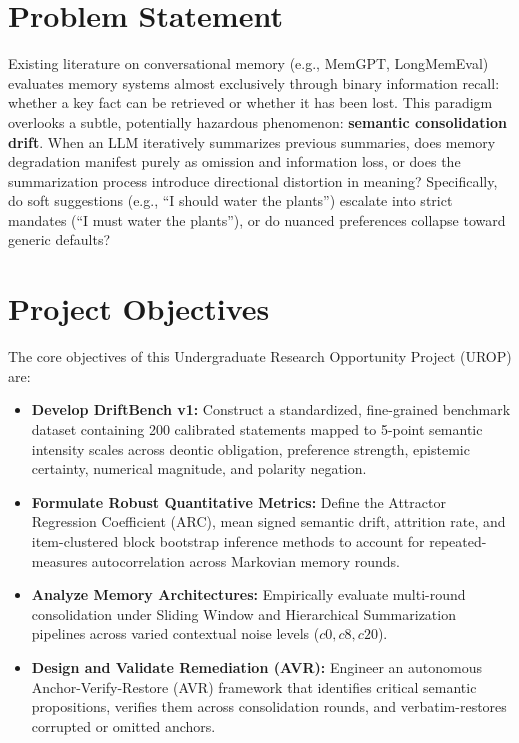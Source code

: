 \documentclass[12pt,a4paper]{report}
\begin{document}
\section{Problem Statement}
Existing literature on conversational memory (e.g., MemGPT, LongMemEval) evaluates memory systems almost exclusively through binary information recall: whether a key fact can be retrieved or whether it has been lost. This paradigm overlooks a subtle, potentially hazardous phenomenon: \textbf{semantic consolidation drift}. When an LLM iteratively summarizes previous summaries, does memory degradation manifest purely as omission and information loss, or does the summarization process introduce directional distortion in meaning? Specifically, do soft suggestions (e.g., ``I should water the plants'') escalate into strict mandates (``I must water the plants''), or do nuanced preferences collapse toward generic defaults?

\section{Project Objectives}
The core objectives of this Undergraduate Research Opportunity Project (UROP) are:
\begin{itemize}
    \item \textbf{Develop DriftBench v1:} Construct a standardized, fine-grained benchmark dataset containing 200 calibrated statements mapped to 5-point semantic intensity scales across deontic obligation, preference strength, epistemic certainty, numerical magnitude, and polarity negation.
    \item \textbf{Formulate Robust Quantitative Metrics:} Define the Attractor Regression Coefficient (ARC), mean signed semantic drift, attrition rate, and item-clustered block bootstrap inference methods to account for repeated-measures autocorrelation across Markovian memory rounds.
    \item \textbf{Analyze Memory Architectures:} Empirically evaluate multi-round consolidation under Sliding Window and Hierarchical Summarization pipelines across varied contextual noise levels ($c0, c8, c20$).
    \item \textbf{Design and Validate Remediation (AVR):} Engineer an autonomous Anchor-Verify-Restore (AVR) framework that identifies critical semantic propositions, verifies them across consolidation rounds, and verbatim-restores corrupted or omitted anchors.
\end{itemize}
\end{document}
